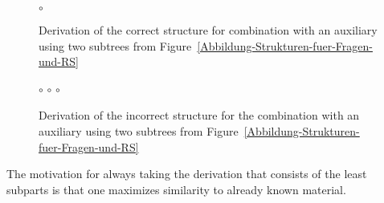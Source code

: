 \begin{figure}
\hfill
{}
\hfill
$\circ$
\hfill
\hspace{5mm}
\hfill\mbox{}
\caption{\label{Abbildung-Kombination-fuer-grammatischen-Satz}Derivation of the correct structure for combination with an auxiliary using two subtrees from
Figure~\ref{Abbildung-Strukturen-fuer-Fragen-und-RS}}
\end{figure}%
%
%
%
%
\begin{figure}
\hfill
{}
\hfill
$\circ$
\hfill
{}
\hfill
$\circ$
\hfill
{}
\hfill
$\circ$
\hfill
{}
\hfill\mbox{}
\caption{\label{Abbildung-Kombination-fuer-ungrammatischen-Satz}Derivation of the incorrect structure
for the combination with an auxiliary using two subtrees from Figure~\ref{Abbildung-Strukturen-fuer-Fragen-und-RS}}
\end{figure}%

\largerpage
The motivation for always taking the derivation that consists of the least subparts is that one maximizes similarity to already known material.

